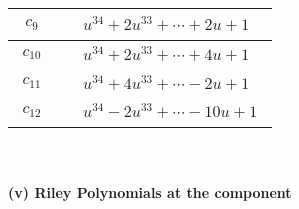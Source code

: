 \documentclass[1p]{elsarticle_modified}
\theoremstyle{definition}
\begin{document}
\begin{tabular}{m{50pt}|m{274pt}}
\hline $$\begin{aligned}c_{9}\end{aligned}$$&$\begin{aligned}
&u^{34}+2 u^{33}+\cdots+2 u+1
\end{aligned}$\\
\hline $$\begin{aligned}c_{10}\end{aligned}$$&$\begin{aligned}
&u^{34}+2 u^{33}+\cdots+4 u+1
\end{aligned}$\\
\hline $$\begin{aligned}c_{11}\end{aligned}$$&$\begin{aligned}
&u^{34}+4 u^{33}+\cdots-2 u+1
\end{aligned}$\\
\hline $$\begin{aligned}c_{12}\end{aligned}$$&$\begin{aligned}
&u^{34}-2 u^{33}+\cdots-10 u+1
\end{aligned}$\\
\hline
\end{tabular}\\~\\
\newpage\renewcommand{\arraystretch}{1}
\flushleft \textbf{(v) Riley Polynomials at the component}\newline \\
\end{document}

